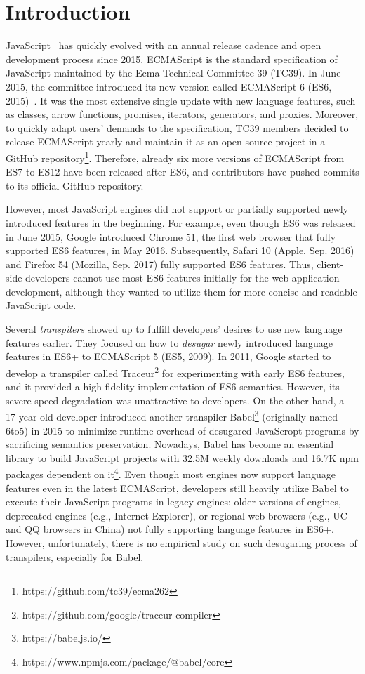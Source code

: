 \section{Introduction}\label{sec:intro}

JavaScript~\cite{js-hopl} has quickly evolved with an annual release cadence and
open development process since 2015. ECMAScript is the standard specification of
JavaScript maintained by the Ecma Technical Committee 39 (TC39). In June 2015,
the committee introduced its new version called ECMAScript 6 (ES6,
2015)~\cite{es6}. It was the most extensive single update with new language
features, such as classes, arrow functions, promises, iterators, generators, and
proxies. Moreover,  to quickly adapt users' demands to the specification, TC39
members decided to release ECMAScript yearly and maintain it as an open-source
project in a GitHub repository\footnote{https://github.com/tc39/ecma262}.
Therefore, already six more versions of ECMAScript from ES7 to ES12 have been
released after ES6, and contributors have pushed  commits to its
official GitHub repository.

However, most JavaScript engines did not support or partially supported newly
introduced features in the beginning. For example, even though ES6 was released
in June 2015, Google introduced Chrome 51, the first web browser that fully
supported ES6 features, in May 2016. Subsequently, Safari 10 (Apple, Sep. 2016)
and Firefox 54 (Mozilla, Sep. 2017) fully supported ES6 features. Thus,
client-side developers cannot use most ES6 features initially for the web
application development, although they wanted to utilize them for more concise
and readable JavaScript code.

Several \textit{transpilers} showed up to fulfill developers' desires to use new
language features earlier. They focused on how to \textit{desugar} newly
introduced language features in ES6+ to ECMAScript 5 (ES5, 2009). In 2011,
Google started to develop a transpiler called
Traceur\footnote{https://github.com/google/traceur-compiler} for experimenting
with early ES6 features, and it provided a high-fidelity implementation of ES6
semantics. However, its severe speed degradation was unattractive to developers.
On the other hand, a 17-year-old developer introduced another transpiler
Babel\footnote{https://babeljs.io/} (originally named 6to5) in 2015 to minimize
runtime overhead of desugared JavaScropt programs by sacrificing semantics
preservation. Nowadays, Babel has become an essential library to build
JavaScript projects with 32.5M weekly downloads and 16.7K npm packages dependent
on it\footnote{https://www.npmjs.com/package/@babel/core}. Even though most
engines now support language features even in the latest ECMAScript, developers
still heavily utilize Babel to execute their JavaScript programs in legacy
engines: older versions of engines, deprecated engines (e.g., Internet
Explorer), or regional web browsers (e.g., UC and QQ browsers in China) not
fully supporting language features in ES6+. However, unfortunately, there is no
empirical study on such desugaring process of transpilers, especially for Babel.

